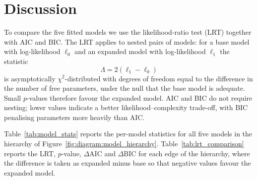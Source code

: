 \section{Discussion}

To compare the five fitted models we use the likelihood-ratio test (LRT)
together with AIC and BIC. The LRT applies to nested pairs of models: for a
base model with log-likelihood $\ell_0$ and an expanded model with
log-likelihood $\ell_1$ the statistic
\begin{equation}
    \Lambda = 2(\ell_1 - \ell_0)
    \label{eq:lrt_statistic}
\end{equation}
is asymptotically $\chi^2$-distributed with degrees of freedom equal to the
difference in the number of free parameters, under the null that the base
model is adequate. Small $p$-values therefore favour the expanded model.
AIC and BIC do not require nesting; lower values indicate a better
likelihood--complexity trade-off, with BIC penalising parameters more
heavily than AIC.

Table~\ref{tab:model_stats} reports the per-model statistics for all five
models in the hierarchy of Figure~\ref{fig:diagram:model_hierarchy}.
Table~\ref{tab:lrt_comparison} reports the LRT, $p$-value, $\Delta\text{AIC}$
and $\Delta\text{BIC}$ for each edge of the hierarchy, where the difference
is taken as expanded minus base so that negative values favour the expanded
model.




